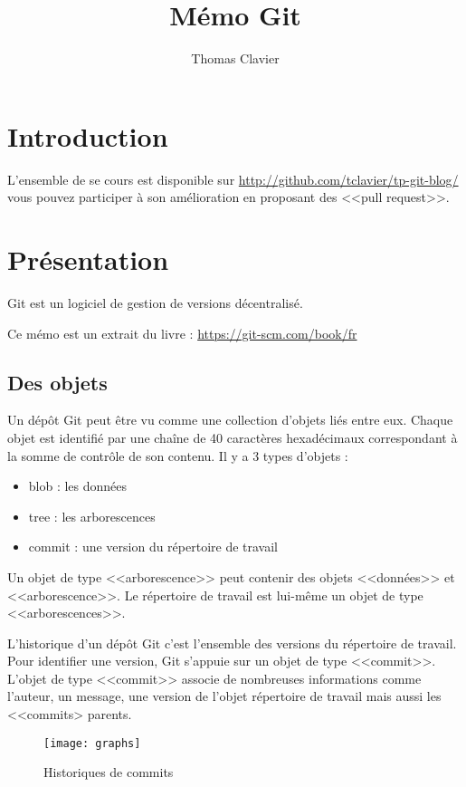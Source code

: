 \documentclass[a4paper]{article}
\title{Mémo Git}
\author{Thomas Clavier}
\date{}
\begin{document}
\maketitle

\section*{Introduction}

L'ensemble de se cours est disponible sur \url{http://github.com/tclavier/tp-git-blog/} vous pouvez participer à son amélioration en proposant des <<pull request>>.

\section*{Présentation}

Git est un logiciel de gestion de versions décentralisé.

Ce mémo est un extrait du livre : \url{https://git-scm.com/book/fr}

\subsection*{Des objets}
Un dépôt Git peut être vu comme une collection d’objets liés entre eux. 
Chaque objet est identifié par une chaîne de 40 caractères hexadécimaux
correspondant à la somme de contrôle de son contenu. 
Il y a 3 types d'objets : 
\begin{itemize}
\item blob : les données
\item tree : les arborescences
\item commit : une version du répertoire de travail
\end{itemize}
Un objet de type <<arborescence>> peut contenir des objets <<données>> et <<arborescence>>.
Le répertoire de travail est lui-même un objet de type <<arborescences>>. 

L'historique d'un dépôt Git c'est l'ensemble des versions du répertoire de travail. Pour identifier une version, Git s'appuie sur un objet de type <<commit>>. 
L'objet de type <<commit>> associe de nombreuses informations comme l'auteur, un message, une version de l'objet répertoire de travail mais aussi les <<commits> parents.

\begin{figure}[h]
  \center
  \texttt{[image: graphs]}
  \caption{Historiques de commits}
\end{figure}
\end{document}
